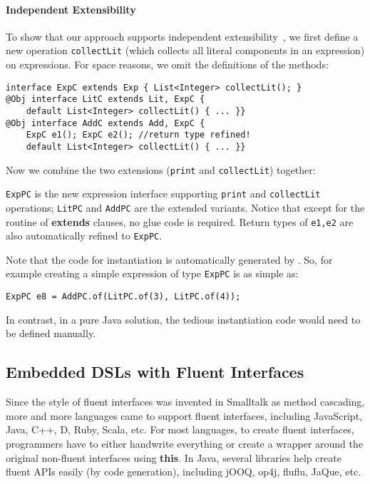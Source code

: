 \paragraph{Independent Extensibility}
To show that our approach supports independent extensibility~\cite{zenger05independentlyextensible}, we first define a
new operation \texttt{collectLit} (which collects all
literal components in an expression) on expressions. For space reasons, 
we omit the definitions of the methods: 

\begin{lstlisting}[]
interface ExpC extends Exp { List<Integer> collectLit(); }
@Obj interface LitC extends Lit, ExpC {
    default List<Integer> collectLit() { ... }}
@Obj interface AddC extends Add, ExpC {
    ExpC e1(); ExpC e2(); //return type refined!
    default List<Integer> collectLit() { ... }}
\end{lstlisting}

\noindent Now we combine the two extensions (\texttt{print} and
\texttt{collectLit}) together:



\noindent \texttt{ExpPC} is the new expression interface supporting
\texttt{print} and \texttt{collectLit} operations; \texttt{LitPC} and
\texttt{AddPC} are the extended variants. Notice that except for the routine of
\textbf{extends} clauses, no glue code is required. Return types of
\texttt{e1,e2} are also automatically refined to \texttt{ExpPC}.

Note that the code for instantiation is automatically generated by \mixin. 
So, for example creating a simple expression of type \texttt{ExpPC} is 
as simple as:
\begin{lstlisting}
ExpPC e8 = AddPC.of(LitPC.of(3), LitPC.of(4));
\end{lstlisting}
\noindent In contrast, in a pure Java solution, the tedious instantiation code would need 
to be defined manually. 

\subsection{Embedded DSLs with Fluent Interfaces}
Since the style of fluent interfaces was invented in Smalltalk as method
cascading, more and more languages came to support fluent interfaces, including
JavaScript, Java, C++, D, Ruby, Scala, etc. For most languages, to create fluent
interfaces, programmers have to either handwrite everything or create a
wrapper around the original non-fluent interfaces using \textbf{this}. In Java,
several libraries help create fluent APIs easily (by code generation), including
jOOQ, op4j, fluflu, JaQue, etc. 

